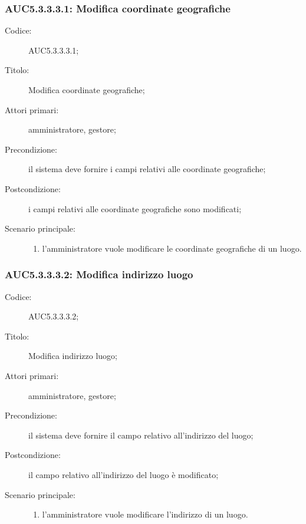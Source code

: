 \subsubsection{AUC5.3.3.3.1: Modifica coordinate geografiche}%
\label{subs:AUC5.3.3.3.1}
\begin{description}
  \item[Codice:] AUC5.3.3.3.1;
  \item[Titolo:] Modifica coordinate geografiche;
  \item[Attori primari:] amministratore, gestore;
  \item[Precondizione:] il sistema deve fornire i campi relativi alle coordinate geografiche;
  \item[Postcondizione:] i campi relativi alle coordinate geografiche sono modificati;
  \item[Scenario principale:]
  \begin{enumerate}
    \item l'amministratore vuole modificare le coordinate geografiche di un luogo.
  \end{enumerate}
\end{description}

\subsubsection{AUC5.3.3.3.2: Modifica indirizzo luogo}%
\label{subs:AUC5.3.3.3.2}
\begin{description}
  \item[Codice:] AUC5.3.3.3.2;
  \item[Titolo:] Modifica indirizzo luogo;
  \item[Attori primari:] amministratore, gestore;
  \item[Precondizione:] il sistema deve fornire il campo relativo all'indirizzo del luogo;
  \item[Postcondizione:] il campo relativo all'indirizzo del luogo è modificato;
  \item[Scenario principale:]
  \begin{enumerate}
    \item l'amministratore vuole modificare l'indirizzo di un luogo.
  \end{enumerate}
\end{description}

